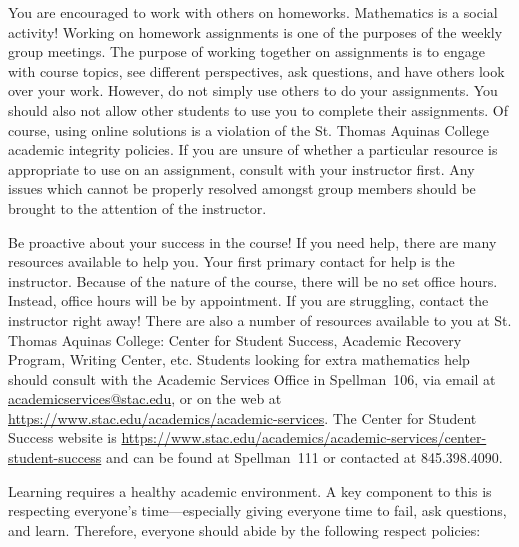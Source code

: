 \documentclass[11pt,letterpaper]{article}
\begin{document}
You are encouraged to work with others on homeworks. Mathematics is a social activity! Working on homework assignments is one of the purposes of the weekly group meetings. The purpose of working together on assignments is to engage with course topics, see different perspectives, ask questions, and have others look over your work. However, do not simply use others to do your assignments. You should also not allow other students to use you to complete their assignments. Of course, using online solutions is a violation of the St. Thomas Aquinas College academic integrity policies. If you are unsure of whether a particular resource is appropriate to use on an assignment, consult with your instructor first. Any issues which cannot be properly resolved amongst group members should be brought to the attention of the instructor. 
\sectionbreak



Be proactive about your success in the course! If you need help, there are many resources available to help you. Your first primary contact for help is the instructor. Because of the nature of the course, there will be no set office hours. Instead, office hours will be by appointment. If you are struggling, contact the instructor right away! There are also a number of resources available to you at St. Thomas Aquinas College: Center for Student Success, Academic Recovery Program, Writing Center, etc. Students looking for extra mathematics help should consult with the Academic Services Office in Spellman~106, via email at \href{mailto:AcademicServices@stac.edu}{academicservices@stac.edu}, or on the web at \href{https://www.stac.edu/academics/academic-services}{https://www.stac.edu/academics/academic-services}. The Center for Student Success website is \url{https://www.stac.edu/academics/academic-services/center-student-success} and can be found at Spellman~111 or contacted at 845.398.4090.
\sectionbreak



Learning requires a healthy academic environment. A key component to this is respecting everyone's time---especially giving everyone time to fail, ask questions, and learn. Therefore, everyone should abide by the following respect policies: 





\newpage
\end{document}
